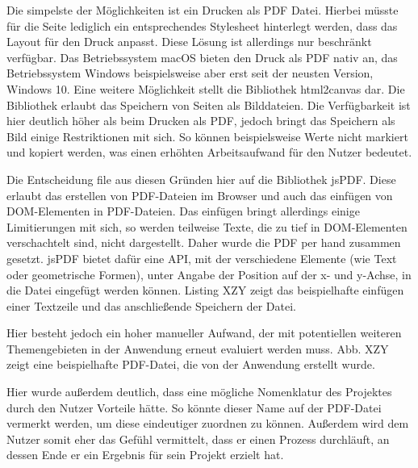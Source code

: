 Die simpelste der Möglichkeiten ist ein Drucken als PDF Datei. Hierbei müsste für die Seite lediglich ein entsprechendes Stylesheet hinterlegt werden, dass das Layout für den Druck anpasst. Diese Lösung ist allerdings nur beschränkt verfügbar. Das Betriebssystem macOS bieten den Druck als PDF nativ an, das Betriebssystem Windows beispielsweise aber erst seit der neusten Version, Windows 10.
Eine weitere Möglichkeit stellt die Bibliothek html2canvas\footnotemark{} dar. Die Bibliothek erlaubt das Speichern von Seiten als Bilddateien. Die Verfügbarkeit ist hier deutlich höher als beim Drucken als PDF, jedoch bringt das Speichern als Bild einige Restriktionen mit sich. So können beispielsweise Werte nicht markiert und kopiert werden, was einen erhöhten Arbeitsaufwand für den Nutzer bedeutet.


Die Entscheidung file aus diesen Gründen hier auf die Bibliothek jsPDF\footnotemark{}. Diese erlaubt das erstellen von PDF-Dateien im Browser und auch das einfügen von DOM-Elementen in PDF-Dateien. Das einfügen bringt allerdings einige Limitierungen mit sich, so werden teilweise Texte, die zu tief in DOM-Elementen verschachtelt sind, nicht dargestellt. Daher wurde die PDF per hand zusammen gesetzt. jsPDF bietet dafür eine API, mit der verschiedene Elemente (wie Text oder geometrische Formen), unter Angabe der Position auf der x- und y-Achse, in die Datei eingefügt werden können. Listing XZY zeigt das beispielhafte einfügen einer Textzeile und das anschließende Speichern der Datei.


Hier besteht jedoch ein hoher manueller Aufwand, der mit potentiellen weiteren Themengebieten in der Anwendung erneut evaluiert werden muss. Abb. XZY zeigt eine beispielhafte PDF-Datei, die von der Anwendung erstellt wurde.

Hier wurde außerdem deutlich, dass eine mögliche Nomenklatur des Projektes durch den Nutzer Vorteile hätte. So könnte dieser Name auf der PDF-Datei vermerkt werden, um diese eindeutiger zuordnen zu können. Außerdem wird dem Nutzer somit eher das Gefühl vermittelt, dass er einen Prozess durchläuft, an dessen Ende er ein Ergebnis für sein Projekt erzielt hat.
